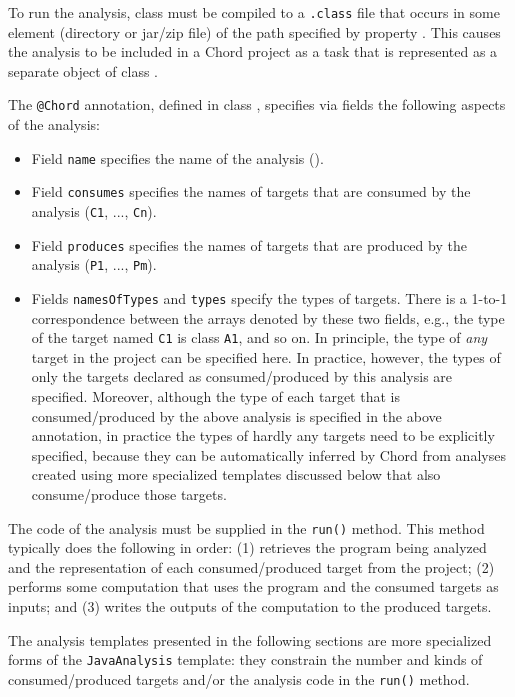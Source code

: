 To run the analysis, class  must be compiled to a
{\tt .class} file that occurs in some element (directory or jar/zip file) of
the path specified by property .  This causes
the analysis to be included in a Chord project as a task that is represented
as a separate object of class .

The {\tt @Chord} annotation, defined in class
, specifies via fields
the following aspects of the analysis:
\begin{itemize}
\item
Field {\tt name} specifies the name of the analysis ().
\item
Field {\tt consumes} specifies the names of targets that are consumed by the
analysis ({\tt C1}, ..., {\tt Cn}).
\item
Field {\tt produces} specifies the names of targets that are produced by the
analysis ({\tt P1}, ..., {\tt Pm}).
\item
Fields {\tt namesOfTypes} and {\tt types} specify the types of targets.  There
is a 1-to-1 correspondence between the arrays denoted by these two fields,
e.g., the type of the target named {\tt C1} is class {\tt A1}, and so on.  In
principle, the type of {\it any} target in the project can be specified here.
In practice, however, the types of only the targets declared as
consumed/produced by this analysis are specified.  Moreover, although the type
of each target that is consumed/produced by the above analysis is specified in
the above annotation, in practice the types of hardly any targets need to be
explicitly specified, because they can be automatically inferred by Chord from
analyses created using more specialized templates discussed below that also
consume/produce those targets.
\end{itemize}

The code of the analysis must be supplied in the {\tt run()} method.  This
method typically does the following in order:
(1) retrieves the program being analyzed and the representation of each
consumed/produced target from the project;
(2) performs some computation that uses the program and the consumed targets
as inputs; and
(3) writes the outputs of the computation to the produced targets.

The analysis templates presented in the following sections are more specialized
forms of the {\tt JavaAnalysis} template: they constrain the number and kinds of
consumed/produced targets and/or the analysis code in the {\tt run()} method.

